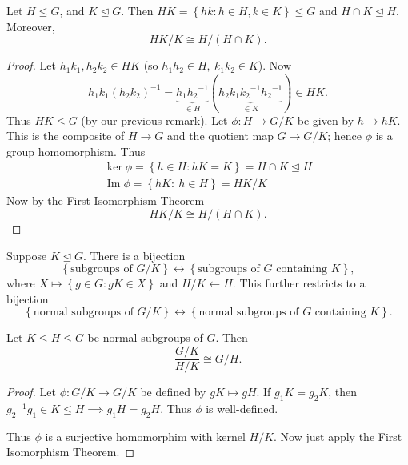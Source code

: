 \documentclass[a4paper]{scrartcl}
\begin{document}
\begin{theorem}
      Let $H \leq G$, and $K \unlhd G$. Then $HK = \left\{hk: h \in H, k \in K\right\} \leq G$ and $H \cap K \unlhd H$. Moreover, \[
      HK/K \cong H/(H \cap K)
      .\] 
\end{theorem}
\begin{proof}
      Let $h_1 k_1 , h_2 k_2 \in HK$ (so $h_1 h_2 \in H, \ k_1 k_2 \in K$). Now \[
      h_1 k_1 {(h_2 k_2 )}^{-1}=\underbrace{h_1 {h_2 }^{-1}}_{\in H} (\underbrace{h_2 k_1 {k_2 }^{-1} {h_2 }^{-1}}_{\in K} )\in HK 
      .\] 
     Thus $HK \leq G$ (by our previous remark). Let $\phi: H \rightarrow G/K$ be given by $h \rightarrow hK$. This is the composite of $H \rightarrow G$ and the quotient map $G \rightarrow G/K$; hence $\phi$ is a group homomorphism. Thus
     \begin{align*}
          \operatorname{ker} \phi = \left\{h \in H: hK=K\right\}=H \cap K \unlhd H \\
          \operatorname{Im} \phi = \left\{hK: \ h \in H\right\}=HK/K
     \end{align*}
     Now by the First Isomorphism Theorem \[
     HK/K \cong H/(H \cap K)
     .\] 
\end{proof}
\begin{lemma}\label{1p2}
      Suppose $K \unlhd G$. There is a bijection \[
      \left\{\text{subgroups of }G/K\right\} \leftrightarrow \left\{\text{subgroups of }G \text{ containing }K\right\}
      ,\] 
     where $X \mapsto \left\{g \in G: gK \in X\right\}$ and $H/K \leftarrow H$. This further restricts to a bijection 
     \[
      \left\{\text{normal subgroups of }G/K\right\} \leftrightarrow \left\{\text{normal subgroups of }G \text{ containing }K\right\}
      .\] 
\end{lemma}
\begin{theorem}
      Let $K \leq H \leq G$ be normal subgroups of $G$. Then \[
      \frac{G/K}{H/K} \cong G/H
      .\] 
\end{theorem}
\begin{proof}
      Let $\phi: G/K \rightarrow G/K$ be defined by $gK \mapsto gH$. If $g_1 K= g_2 K$, then ${g_2 }^{-1}g_1 \in K \leq H \implies  g_1 H= g_2 H$. Thus $\phi$ is well-defined.
      
      Thus $\phi$ is a surjective homomorphim with kernel $H/K$. Now just apply the First Isomorphism Theorem.
\end{proof}
\end{document}
